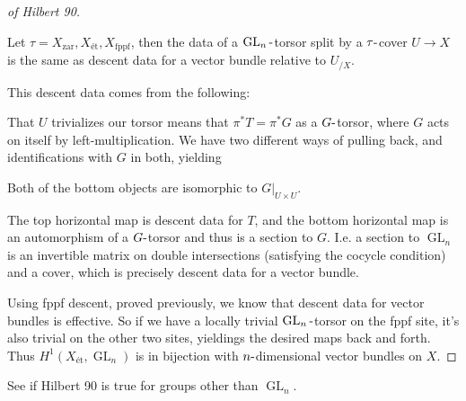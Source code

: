 \begin{proof}[of Hilbert 90]

\begin{observation}

Let
\(\tau = X_{{\mathrm{zar}}}, X_\text{ét}, X_{\mathrm{\operatorname{fppf}}}\),
then the data of a \(\operatorname{GL}_n{\hbox{-}}\)torsor split by a
\(\tau{\hbox{-}}\)cover \(U\to X\) is the same as descent data for a
vector bundle relative to \(U_{/X}\).

\end{observation}

\vspace{2em}

This descent data comes from the following:

That \(U\) trivializes our torsor means that \(\pi^* T = \pi^* G\) as a
\(G{\hbox{-}}\)torsor, where \(G\) acts on itself by
left-multiplication. We have two different ways of pulling back, and
identifications with \(G\) in both, yielding

Both of the bottom objects are isomorphic to
\({ \left.{{G}} \right|_{{U\times U}} }\).

\begin{claim}

The top horizontal map is descent data for \(T\), and the bottom
horizontal map is an automorphism of a \(G{\hbox{-}}\)torsor and thus is
a section to \(G\). I.e. a section to \(\operatorname{GL}_n\) is an
invertible matrix on double intersections (satisfying the cocycle
condition) and a cover, which is precisely descent data for a vector
bundle.

\end{claim}

Using fppf descent, proved previously, we know that descent data for
vector bundles is effective. So if we have a locally trivial
\(\operatorname{GL}_n{\hbox{-}}\)torsor on the fppf site, it's also
trivial on the other two sites, yieldings the desired maps back and
forth. Thus \(H^1(X_\text{ét}, \operatorname{GL}_n)\) is in bijection
with \(n{\hbox{-}}\)dimensional vector bundles on \(X\).

\end{proof}

\begin{exercise}[?]

See if Hilbert 90 is true for groups other than \(\operatorname{GL}_n\).

\end{exercise}

